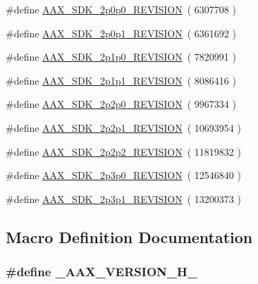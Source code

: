 \begin{DoxyCompactItemize}
\#define \hyperlink{a00308_a6812efd6aa67be81303111a96a198f8f}{A\+A\+X\+\_\+\+S\+D\+K\+\_\+2p0p0\+\_\+\+R\+E\+V\+I\+S\+I\+O\+N}~( 6307708 )
\item 
\#define \hyperlink{a00308_a3767dbdbc177e52acb0f40538d97fa62}{A\+A\+X\+\_\+\+S\+D\+K\+\_\+2p0p1\+\_\+\+R\+E\+V\+I\+S\+I\+O\+N}~( 6361692 )
\item 
\#define \hyperlink{a00308_a5437de433f71ac4e532af9f5c92304d3}{A\+A\+X\+\_\+\+S\+D\+K\+\_\+2p1p0\+\_\+\+R\+E\+V\+I\+S\+I\+O\+N}~( 7820991 )
\item 
\#define \hyperlink{a00308_a53c6643ef3a6e56f9cd1123450edd167}{A\+A\+X\+\_\+\+S\+D\+K\+\_\+2p1p1\+\_\+\+R\+E\+V\+I\+S\+I\+O\+N}~( 8086416 )
\item 
\#define \hyperlink{a00308_a3eb1986d2b098fe43668950ed3316a19}{A\+A\+X\+\_\+\+S\+D\+K\+\_\+2p2p0\+\_\+\+R\+E\+V\+I\+S\+I\+O\+N}~( 9967334 )
\item 
\#define \hyperlink{a00308_a83e27e34a803732c8ec1293ce73c3406}{A\+A\+X\+\_\+\+S\+D\+K\+\_\+2p2p1\+\_\+\+R\+E\+V\+I\+S\+I\+O\+N}~( 10693954 )
\item 
\#define \hyperlink{a00308_ac68aa5c59e0bdaf842970dc0c770b2da}{A\+A\+X\+\_\+\+S\+D\+K\+\_\+2p2p2\+\_\+\+R\+E\+V\+I\+S\+I\+O\+N}~( 11819832 )
\item 
\#define \hyperlink{a00308_ae723e68321a5eefbd89cac5c4bae6009}{A\+A\+X\+\_\+\+S\+D\+K\+\_\+2p3p0\+\_\+\+R\+E\+V\+I\+S\+I\+O\+N}~( 12546840 )
\item 
\#define \hyperlink{a00308_a3a4ccb5c34d6cdbb0cf55945bec952b7}{A\+A\+X\+\_\+\+S\+D\+K\+\_\+2p3p1\+\_\+\+R\+E\+V\+I\+S\+I\+O\+N}~( 13200373 )
\end{DoxyCompactItemize}


\subsection{Macro Definition Documentation}
\hypertarget{a00308_aa2233aa6f57ff48373eddf8aeda68919}{}
\subsubsection[{\+\_\+\+A\+A\+X\+\_\+\+V\+E\+R\+S\+I\+O\+N\+\_\+\+H\+\_\+}]{\setlength{\rightskip}{0pt plus 5cm}\#define \+\_\+\+A\+A\+X\+\_\+\+V\+E\+R\+S\+I\+O\+N\+\_\+\+H\+\_\+}\label{a00308_aa2233aa6f57ff48373eddf8aeda68919}
\hypertarget{a00308_aeff268cb7f4d2cc612df086c22b0f1f2}{}
